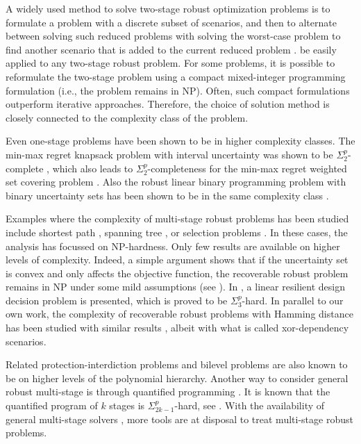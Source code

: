 A widely used method to solve two-stage robust optimization problems is to formulate a problem with a discrete subset of scenarios, and then to alternate between solving such reduced problems with solving the worst-case problem to find another scenario that is added to the current reduced problem \cite{aissi2009min,zeng2013solving}. 
 be easily applied to any two-stage robust problem. For some problems, it is possible to reformulate the two-stage problem using a compact mixed-integer programming formulation (i.e., the problem remains in NP). Often, such compact formulations outperform iterative approaches. Therefore, the choice of solution method is closely connected to the complexity class of the problem.

Even one-stage problems have been shown to be in higher complexity classes. The min-max regret knapsack problem with interval uncertainty was shown to be $\Sigma^p_2$-complete \cite{deineko2010pinpointing}, which also leads to $\Sigma^p_2$-completeness for the min-max regret weighted set covering problem \cite{coco2022robust}. Also the robust linear binary programming problem with binary uncertainty sets has been shown to be in the same complexity class \cite{claus2020note}.

Examples where the complexity of multi-stage robust problems has been studied include
shortest path \cite{busing2012paths}, spanning tree \cite{kasperski2011approximability}, or selection problems \cite{kasperski2015robust,goerigk2022recoverable}. In these cases, the analysis has focussed on NP-hardness. Only few results are available on higher levels of complexity. Indeed, a simple argument shows that if the uncertainty set is convex and only affects the objective function, the recoverable robust problem remains in NP under some mild assumptions (see \cite{hanasusanto2015k,buchheim2017min,bold2020}). In \cite{pfetsch2021generic}, a linear resilient design decision problem is presented, which is proved to be $\Sigma^p_3$-hard. In parallel to our own work, the complexity of recoverable robust problems with Hamming distance has been studied with similar results \cite{grune2022complexity}, albeit with what is called xor-dependency scenarios.

Related protection-interdiction problems \cite{nabli2022complexity} and bilevel problems \cite{caprara2016bilevel} are also known to be on higher levels of the polynomial hierarchy. Another way to consider general robust multi-stage is through quantified programming \cite{goerigk2021multistage}. It is known that the quantified program of $k$ stages is $\Sigma^p_{2k-1}$-hard, see \cite{chistikov2017complexity,nguyen2020computational}. With the availability of general multi-stage solvers \cite{phdhartisch}, more tools are at disposal to treat multi-stage robust problems.

